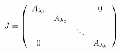 \documentclass{article}
\begin{document}
\begin{preview}
$
  J = 
    \left(
      \begin{array}{*4{c}}
        A_{\lambda_1} &               &        & 0\\
                      & A_{\lambda_2} &        &  \\
                      &               & \ddots &  \\
           0          &               &        & A_{\lambda_k}
      \end{array}
    \right)
$
\end{preview}
\end{document}
